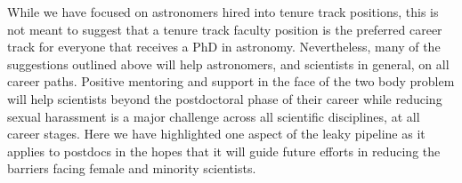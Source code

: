 \documentclass[modern]{aastex62}
\begin{document}
While we have focused on astronomers hired into tenure track positions, this is not meant to suggest that a tenure track faculty position is the preferred career track for everyone that receives a PhD in astronomy. Nevertheless, many of the suggestions outlined above will help astronomers, and scientists in general, on all career paths. Positive mentoring and support in the face of the two body problem will help scientists beyond the postdoctoral phase of their career while reducing sexual harassment is a major challenge across all scientific disciplines, at all career stages. Here we have highlighted one aspect of the leaky pipeline as it applies to postdocs in the hopes that it will guide future efforts in reducing the barriers facing female and minority scientists. 







\end{document}
